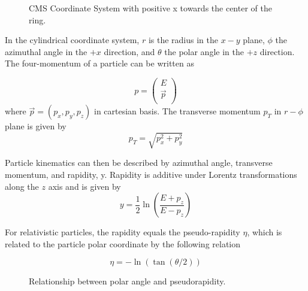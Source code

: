 \begin{figure}[htbp!]
\centering
{}
\caption{CMS Coordinate System with positive x towards the center of the ring.} \label{fig:CMS:Coordinate}
\end{figure}


In the cylindrical coordinate system,  $r$ is the radius in the $x-y$ plane, $\phi$ the azimuthal
angle in the $+x$ direction, and $\theta$ the polar angle in the $+z$ direction. The four-momentum of a particle can be written as

$$
p =   \begin{pmatrix}
    E\\
    \vec{p}\\
  \end{pmatrix}  
$$
where $\vec{p} = (p_{x}, p_{y}, p_{z})$ in cartesian basis. The transverse momentum $p_{T}$ in $r - \phi $ plane is given by 
$$ 
p_{T} = \sqrt{p_{x}^{2} + p_{y}^{2}}
$$

Particle kinematics can then be described by azimuthal angle, transverse momentum, and rapidity, y. Rapidity is additive under Lorentz transformations along the $z$ axis and is given by
$$
y = \frac{1}{2} \ln \left( \frac{E+p_{z}}{E-p_{z}} \right)
$$

For relativistic particles, the rapidity equals the pseudo-rapidity $\eta$, which is related to the particle polar coordinate by the following relation

$$
\eta = -\ln(\tan(\theta/2))
$$


\begin{figure}
\centering
{}    
    \caption{Relationship between polar angle and pseudorapidity.}
\end{figure}


